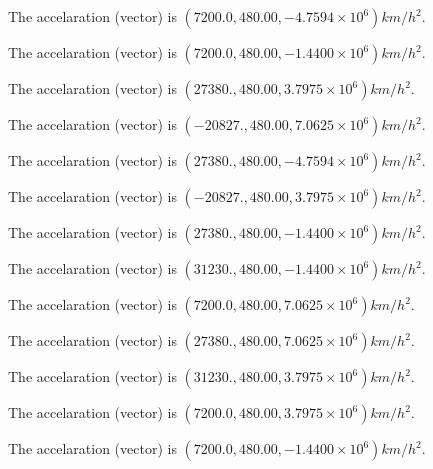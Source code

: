 \documentclass[12pt]{article}
\begin{document}
 
 
The accelaration (vector) is
$(
7200.0,
480.00 ,
-4.7594 \times 10^{6}
)km/h^2.
$
 
 
The accelaration (vector) is
$(
7200.0,
480.00 ,
-1.4400 \times 10^{6}
)km/h^2.
$
 
 
The accelaration (vector) is
$(
27380.,
480.00 ,
3.7975 \times 10^{6}
)km/h^2.
$
 
 
The accelaration (vector) is
$(
-20827.,
480.00 ,
7.0625 \times 10^{6}
)km/h^2.
$
 
 
The accelaration (vector) is
$(
27380.,
480.00 ,
-4.7594 \times 10^{6}
)km/h^2.
$
 
 
The accelaration (vector) is
$(
-20827.,
480.00 ,
3.7975 \times 10^{6}
)km/h^2.
$
 
 
The accelaration (vector) is
$(
27380.,
480.00 ,
-1.4400 \times 10^{6}
)km/h^2.
$
 
 
The accelaration (vector) is
$(
31230.,
480.00 ,
-1.4400 \times 10^{6}
)km/h^2.
$
 
 
The accelaration (vector) is
$(
7200.0,
480.00 ,
7.0625 \times 10^{6}
)km/h^2.
$
 
 
The accelaration (vector) is
$(
27380.,
480.00 ,
7.0625 \times 10^{6}
)km/h^2.
$
 
 
The accelaration (vector) is
$(
31230.,
480.00 ,
3.7975 \times 10^{6}
)km/h^2.
$
 
 
The accelaration (vector) is
$(
7200.0,
480.00 ,
3.7975 \times 10^{6}
)km/h^2.
$
 
 
\noindent{}
 
 
The accelaration (vector) is
$(
7200.0,
480.00 ,
-1.4400 \times 10^{6}
)km/h^2.
$
 
 
\noindent{}
 
 
 
 
 
 
\noindent{}
 
\end{document}
